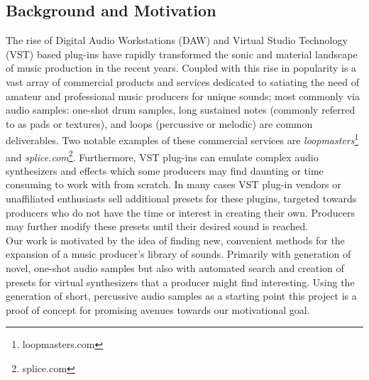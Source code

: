 \documentclass{nime-alternate} %
\begin{document}
\subsection{Background and Motivation}
The rise of Digital Audio Workstations (DAW) \cite{leider2004digital} and Virtual Studio Technology (VST) based plug-ins \cite{tanev2013virtual} have rapidly transformed the sonic and material landscape of music production in the recent years. Coupled with this rise in popularity is a vast array of commercial products and services dedicated to satiating the need of amateur and professional music producers for unique sounds; most commonly via audio samples: one-shot drum samples, long sustained notes (commonly referred to as pads or textures), and loops (percussive or melodic) are common deliverables. Two notable examples of these commercial services are \textit{loopmasters}\footnote{loopmasters.com} and \textit{splice.com}\footnote{splice.com}. Furthermore, VST plug-ins can emulate complex audio synthesizers and effects which some producers may find daunting or time consuming to work with from scratch. In many cases VST plug-in vendors or unaffiliated enthusiasts sell additional presets for these plugins, targeted towards producers who do not have the time or interest in creating their own. Producers may further modify these presets until their desired sound is reached.\\
Our work is motivated by the idea of finding new, convenient methods for the expansion of a music producer's library of sounds. Primarily with generation of novel, one-shot audio samples but also with automated search and creation of presets for virtual synthesizers that a producer might find  interesting. Using the generation of short, percussive audio samples as a starting point this project is a proof of concept for promising avenues towards our motivational goal.\\
\end{document}
